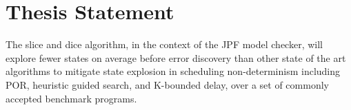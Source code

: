 \section{Thesis Statement}
The slice and dice algorithm, in the context of the JPF model checker,
will explore fewer states on average before error discovery than other
state of the art algorithms to mitigate state explosion in scheduling
non-determinism including POR, heuristic guided search, and K-bounded
delay, over a set of commonly accepted benchmark programs.
